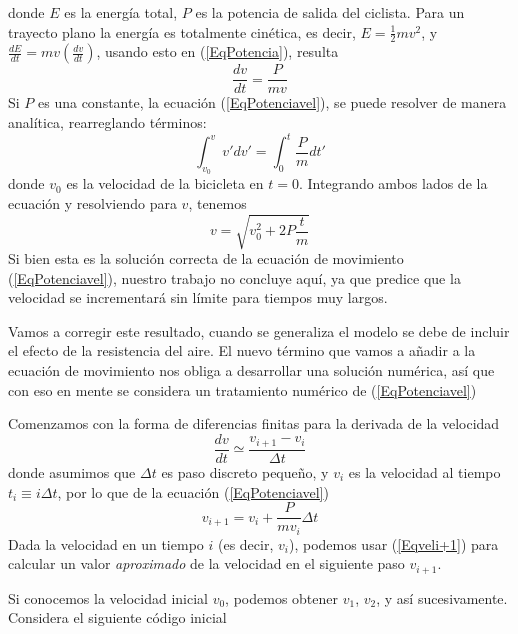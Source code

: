 \documentclass[12pt]{article}
\begin{document}
donde $E$ es la energía total, $P$ es la potencia de salida del ciclista. Para un trayecto plano la energía es totalmente cinética, es decir, $E = \frac{1}{2} m v^{2}$, y $\frac{dE}{dt} = mv (\frac{dv}{dt})$, usando esto en (\ref{EqPotencia}), resulta
\begin{equation}\label{EqPotenciavel}
\dfrac{dv}{dt} = \dfrac{P}{mv}
\end{equation}
Si $P$ es una constante, la ecuación (\ref{EqPotenciavel}), se puede resolver de manera analítica, rearreglando términos:
\begin{equation}\label{EqIntegral}
\int_{v_{0}}^{v} v' dv' = \int_{0}^{t} \dfrac{P}{m} dt'
\end{equation}
donde $v_{0}$ es la velocidad de la bicicleta en $t=0$. Integrando ambos lados de la ecuación y resolviendo para $v$, tenemos
\begin{equation}\label{Eqvres}
v = \sqrt{v_{0}^{2} + 2 P \dfrac{t}{m}}
\end{equation}
Si bien esta es la solución correcta de la ecuación de movimiento (\ref{EqPotenciavel}), nuestro trabajo no concluye aquí, ya que predice que la velocidad se incrementará sin límite para tiempos muy largos.
\par
Vamos a corregir este resultado, cuando se generaliza el modelo se debe de incluir el efecto de la resistencia del aire. El nuevo término que vamos a añadir a la ecuación de movimiento nos obliga a desarrollar una solución numérica, así que con eso en mente se considera un tratamiento numérico de (\ref{EqPotenciavel})
\par
Comenzamos con la forma de diferencias finitas para la derivada de la velocidad
\begin{equation}\label{Eqderivada}
\dfrac{dv}{dt} \simeq \dfrac{v_{i+1}-v_{i}}{\Delta t}
\end{equation}
donde asumimos que $\Delta t$ es paso discreto pequeño, y $v_{i}$ es la velocidad al tiempo $t_{i} \equiv i \Delta t$, por lo que de la ecuación (\ref{EqPotenciavel})
\begin{equation}\label{Eqveli+1}
v_{i+1} = v_{i} + \dfrac{P}{m v_{i}} \Delta t
\end{equation}
Dada la velocidad en un tiempo $i$ (es decir, $v_{i}$), podemos usar (\ref{Eqveli+1}) para calcular un valor \textit{aproximado} de la velocidad en el siguiente paso $v_{i+1}$.
\par
Si conocemos la velocidad inicial $v_{0}$, podemos obtener $v_{1}$, $v_{2}$, y así sucesivamente.
Considera el siguiente código inicial
\end{document}
